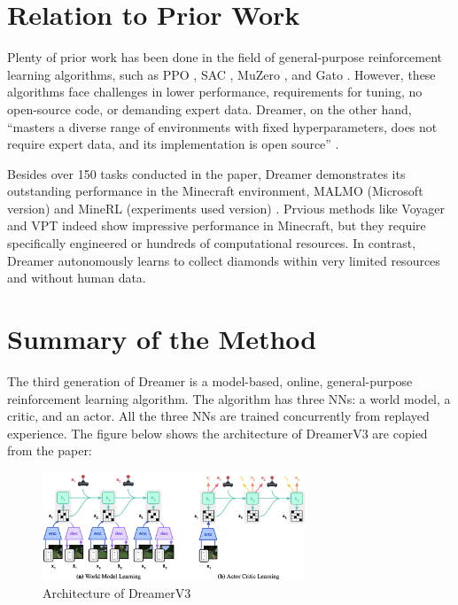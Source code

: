 \documentclass{article}
\begin{document}
\section{Relation to Prior Work}

Plenty of prior work has been done in the field of general-purpose reinforcement learning algorithms, such as PPO \cite{schulman2017proximal}, SAC \cite{haarnoja2018soft}, MuZero \cite{schrittwieser2020mastering}, and Gato \cite{reed2022generalist}. However, these algorithms face challenges in lower performance, requirements for tuning, no open-source code, or demanding expert data. Dreamer, on the other hand, ``masters a diverse range of environments with fixed hyperparameters, does not require expert data, and its implementation is open source'' \cite{hafner2023mastering}.

Besides over 150 tasks conducted in the paper, Dreamer demonstrates its outstanding performance in the Minecraft environment, MALMO (Microsoft version) \cite{johnson2016malmo} and MineRL (experiments used version) \cite{milani2020minerl}. Prvious methods like Voyager \cite{wang2023voyager} and VPT \cite{baker2022video} indeed show impressive performance in Minecraft, but they require specifically engineered or hundreds of computational resources. In contrast, Dreamer autonomously learns to collect diamonds within very limited resources and without human data.

\section{Summary of the Method}

The third generation of Dreamer is a model-based, online, general-purpose reinforcement learning algorithm. The algorithm has three NNs: a world model, a critic, and an actor. All the three NNs are trained concurrently from replayed experience. The figure below shows the architecture of DreamerV3 are copied from the paper:

\begin{figure}[h]
    \centering
\includegraphics[width=0.7\textwidth]{./pics/learnings.png}
    \caption{Architecture of DreamerV3 \cite{hafner2023mastering}}
    \label{fig:architecture}
\end{figure}
\end{document}
